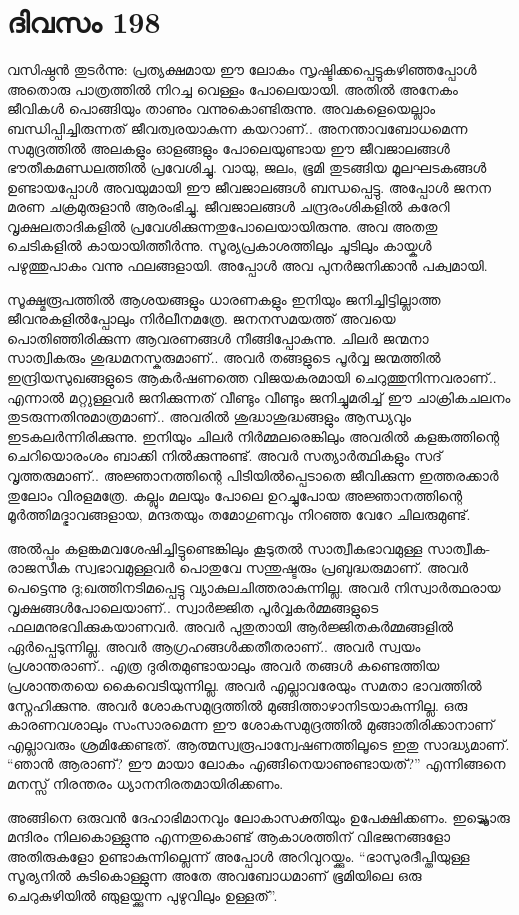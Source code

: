 \section{ദിവസം 198}


വസിഷ്ഠൻ തുടർന്നു: പ്രത്യക്ഷമായ ഈ ലോകം സൃഷ്ടിക്കപ്പെട്ടുകഴിഞ്ഞപ്പോൾ അതൊരു പാത്രത്തിൽ നിറച്ച വെള്ളം പോലെയായി. അതിൽ അനേകം ജീവികൾ പൊങ്ങിയും താണും വന്നുകൊണ്ടിരുന്നു. അവകളെയെല്ലാം ബന്ധിപ്പിച്ചിരുന്നത് ജീവത്വരയാകുന്ന കയറാണ്‌.. അനന്താവബോധമെന്ന സമുദ്രത്തിൽ അലകളും ഓളങ്ങളും പോലെയുണ്ടായ ഈ ജീവജാലങ്ങൾ ഭൗതീകമണ്ഡലത്തിൽ പ്രവേശിച്ചു. വായു, ജലം, ഭൂമി തുടങ്ങിയ മൂലഘടകങ്ങൾ ഉണ്ടായപ്പോൾ അവയുമായി ഈ ജീവജാലങ്ങൾ ബന്ധപ്പെട്ടു. അപ്പോൾ ജനന മരണ ചക്രമുരുളാൻ ആരംഭിച്ചു. ജീവജാലങ്ങൾ ചന്ദ്രരംശികളിൽ കരേറി വൃക്ഷലതാദികളിൽ പ്രവേശിക്കുന്നതുപോലെയായിരുന്നു. അവ അതതു ചെടികളിൽ കായായിത്തീർന്നു. സൂര്യപ്രകാശത്തിലും ചൂടിലും കായ്കൾ പഴുത്തുപാകം വന്നു ഫലങ്ങളായി. അപ്പോൾ അവ പുനർജനിക്കാൻ പക്വമായി.

സൂക്ഷ്മരൂപത്തിൽ ആശയങ്ങളും ധാരണകളും ഇനിയും ജനിച്ചിട്ടില്ലാത്ത ജീവനുകളിൽപ്പോലും നിർലീനമത്രേ. ജനനസമയത്ത് അവയെ പൊതിഞ്ഞിരിക്കുന്ന ആവരണങ്ങൾ നീങ്ങിപ്പോകുന്നു. ചിലർ ജന്മനാ സാത്വികരും ശുദ്ധമനസ്കരുമാണ്‌.. അവർ തങ്ങളുടെ പൂർവ്വ ജന്മത്തിൽ ഇന്ദ്രിയസുഖങ്ങളുടെ ആകർഷണത്തെ വിജയകരമായി ചെറുത്തുനിന്നവരാണ്‌.. എന്നാൽ മറ്റുള്ളവർ ജനിക്കുന്നത് വീണ്ടും വീണ്ടും ജനിച്ചുമരിച്ച് ഈ ചാക്രികചലനം തുടരുന്നതിനുമാത്രമാണ്‌.. അവരിൽ ശുദ്ധാശുദ്ധങ്ങളും ആന്ധ്യവും ഇടകലർന്നിരിക്കുന്നു. ഇനിയും ചിലർ നിർമ്മലരെങ്കിലും അവരിൽ കളങ്കത്തിന്റെ ചെറിയൊരംശം ബാക്കി നിൽക്കുന്നുണ്ട്. അവർ സത്യാർത്ഥികളും സദ് വൃത്തരുമാണ്‌.. അജ്ഞാനത്തിന്റെ പിടിയിൽപ്പെടാതെ ജീവിക്കുന്ന ഇത്തരക്കാർ തുലോം വിരളമത്രേ. കല്ലും മലയും പോലെ ഉറച്ചുപോയ അജ്ഞാനത്തിന്റെ മൂർത്തിമദ്ഭാവങ്ങളായ, മന്ദതയും തമോഗുണവും നിറഞ്ഞ വേറേ ചിലരുമുണ്ട്.

അൽപ്പം കളങ്കമവശേഷിച്ചിട്ടുണ്ടെങ്കിലും കൂടുതൽ സാത്വീകഭാവമുള്ള സാത്വീക-രാജസീക സ്വഭാവമുള്ളവർ പൊതുവേ സന്തുഷ്ടരും പ്രബുദ്ധരുമാണ്. അവർ പെട്ടെന്നു ദു;ഖത്തിനടിമപ്പെട്ടു വ്യാകുലചിത്തരാകുന്നില്ല. അവർ നിസ്വാർത്ഥരായ വൃക്ഷങ്ങൾപോലെയാണ്‌.. സ്വാർജ്ജിത പൂർവ്വകർമ്മങ്ങളുടെ ഫലമനുഭവിക്കുകയാണവർ. അവർ പുതുതായി ആർജ്ജിതകർമ്മങ്ങളിൽ ഏർപ്പെടുന്നില്ല. അവർ ആഗ്രഹങ്ങൾക്കതീതരാണ്‌.. അവർ സ്വയം പ്രശാന്തരാണ്‌.. എത്ര ദുരിതമുണ്ടായാലും അവർ തങ്ങൾ കണ്ടെത്തിയ പ്രശാന്തതയെ കൈവെടിയുന്നില്ല. അവർ എല്ലാവരേയും സമതാ ഭാവത്തിൽ സ്നേഹിക്കുന്നു. അവർ ശോകസമുദ്രത്തിൽ മുങ്ങിത്താഴാനിടയാകുന്നില്ല. ഒരു കാരണവശാലും സംസാരമെന്ന ഈ ശോകസമുദ്രത്തിൽ മുങ്ങാതിരിക്കാനാണ്‌ എല്ലാവരും ശ്രമിക്കേണ്ടത്. ആത്മസ്വരൂപാന്വേഷണത്തിലൂടെ ഇതു സാദ്ധ്യമാണ്‌. “ഞാൻ ആരാണ്‌? ഈ മായാ ലോകം എങ്ങിനെയാണുണ്ടായത്?” എന്നിങ്ങനെ മനസ്സ് നിരന്തരം ധ്യാനനിരതമായിരിക്കണം.

അങ്ങിനെ ഒരുവൻ ദേഹാഭിമാനവും ലോകാസക്തിയും ഉപേക്ഷിക്കണം. ഇട്യ്ക്കൊരു മന്ദിരം നിലകൊള്ളുന്നു എന്നതുകൊണ്ട് ആകാശത്തിന്‌ വിഭജനങ്ങളോ അതിരുകളോ ഉണ്ടാകുന്നില്ലെന്ന് അപ്പോൾ അറിവുറയ്ക്കും. “ഭാസുരദീപ്തിയുള്ള സൂര്യനിൽ കുടികൊള്ളുന്ന അതേ അവബോധമാണ്‌ ഭൂമിയിലെ ഒരു ചെറുകുഴിയിൽ ഞുളയ്ക്കുന്ന പുഴുവിലും ഉള്ളത്”. 

